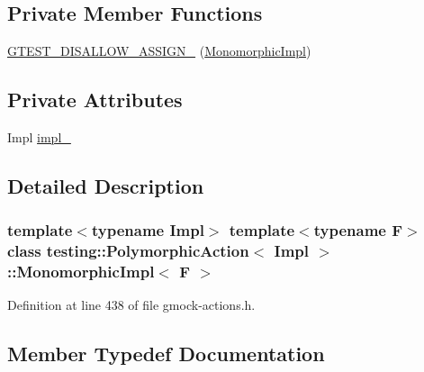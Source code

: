 \subsection*{Private Member Functions}
\begin{DoxyCompactItemize}
\item 
\hyperlink{classtesting_1_1PolymorphicAction_1_1MonomorphicImpl_af7b6ce4640aac3dcf7126c4b1e86f277}{G\+T\+E\+S\+T\+\_\+\+D\+I\+S\+A\+L\+L\+O\+W\+\_\+\+A\+S\+S\+I\+G\+N\+\_\+} (\hyperlink{classtesting_1_1PolymorphicAction_1_1MonomorphicImpl}{Monomorphic\+Impl})
\end{DoxyCompactItemize}
\subsection*{Private Attributes}
\begin{DoxyCompactItemize}
\item 
Impl \hyperlink{classtesting_1_1PolymorphicAction_1_1MonomorphicImpl_a77375e13255f50b45498e0d9c2395d72}{impl\+\_\+}
\end{DoxyCompactItemize}


\subsection{Detailed Description}
\subsubsection*{template$<$typename Impl$>$\newline
template$<$typename F$>$\newline
class testing\+::\+Polymorphic\+Action$<$ Impl $>$\+::\+Monomorphic\+Impl$<$ F $>$}



Definition at line 438 of file gmock-\/actions.\+h.



\subsection{Member Typedef Documentation}
\mbox{\label{classtesting_1_1PolymorphicAction_1_1MonomorphicImpl_a2d6ef64336f1d5cdac893fb040048c8c}} 
